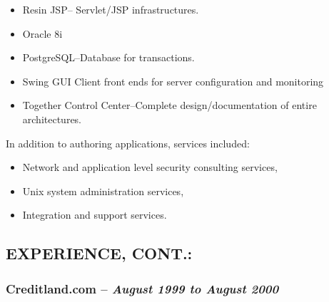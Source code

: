 \documentclass[10pt]{report}
\begin{document}
\begin{description}
\begin{list}{-}{}
\begin{itemize}
				\item{Resin JSP--} Servlet/JSP infrastructures.

				\item{Oracle 8i}

				\item{PostgreSQL--}Database for transactions.

				\item{Swing GUI Client front ends for server configuration and
				monitoring}

				\item{Together Control Center--}Complete design/documentation of entire
				architectures.

			\end{itemize}

			In addition to authoring applications, services included:

			\begin{itemize}

				\item Network and application level security consulting services,

				\item Unix system administration services,

				\item Integration and support services.

			\end{itemize}

		\end{list}

	\end{description}



\subsection*{EXPERIENCE, CONT.:}

  \subsubsection*{Creditland.com -- \emph{August 1999 to August 2000}}
\end{document}
